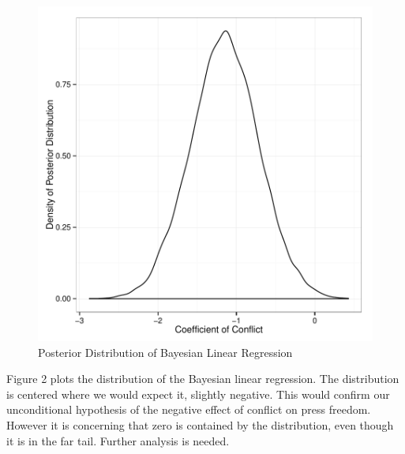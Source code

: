 \documentclass[12pt]{article}
\begin{document}
\begin{enumerate}
\begin{figure}[htbp] 
  \caption{Posterior Distribution of Bayesian Linear Regression}
  \label{F:b.conflict.plot}
  \begin{center}
    \includegraphics[width=5.25in]{Exam-f2.pdf}
  \end{center}
\end{figure}

Figure 2 plots the distribution of the Bayesian linear regression.  The distribution is centered where we would expect it, slightly negative.  This would confirm our unconditional hypothesis of the negative effect of conflict on press freedom.  However it is concerning that zero is contained by the distribution, even though it is in the far tail.  Further analysis is needed.

\pagebreak


\end{enumerate}
\end{document}
